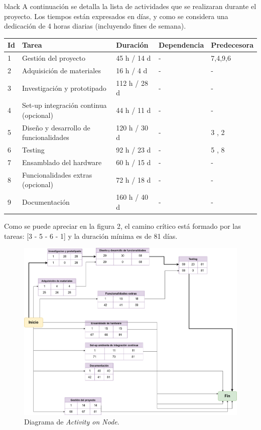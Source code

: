 \documentclass[
11pt, %
]{charter}
\begin{document}
\begin{consigna}{black}
A continuación se detalla la lista de actividades que se realizaran durante el proyecto. Los tiempos están expresados en días, y como se considera una dedicación de 4 horas diarias (incluyendo fines de semana). 

\begin{table}[ht]
\begin{tabularx}{\linewidth}{@{}|l|X|l|l|l|@{}}
\hline
\rowcolor[HTML]{C0C0C0} 
Id	& Tarea           									& Duración 			& Dependencia	& Predecesora 	\\ \hline
1	& Gestión del proyecto 								& 45 h / 14 d		& -				&  7,4,9,6 		\\ \hline
2	& Adquisición de materiales 						& 16 h / 4 d		& -				&  -      		\\ \hline
3	& Investigación y prototipado						& 112 h / 28 d		& -				&  -      		\\ \hline
4	& Set-up integración continua (opcional)			& 44 h / 11 d   	& -        		&  -			\\ \hline
5	& Diseño y desarrollo de funcionalidades    		& 120 h / 30 d		& -			 	& 3 , 2			\\ \hline
6	& Testing								    		& 92 h / 23 d		& -				& 5 , 8			\\ \hline
7	& Ensamblado del hardware				    		& 60 h / 15 d		& -				& -				\\ \hline
8	& Funcionalidades extras (opcional)					& 72 h / 18 d		& -				& - 			\\ \hline
9	& Documentación    									& 160 h / 40 d		& -			 	& -				\\ \hline

\end{tabularx}
\end{table}


Como se puede apreciar en la figura 2, el camino crítico está formado por las tareas: [3 - 5 - 6 - 1] y la duración mínima es de 81 días.


\begin{figure}[htpb]
\centering 
\includegraphics[width=.9\textwidth]{./Figuras/activity-on-node.png}
\caption{Diagrama de \textit{Activity on Node}.}
\label{fig:diagBloques}
\end{figure}
\end{consigna}
\end{document}
